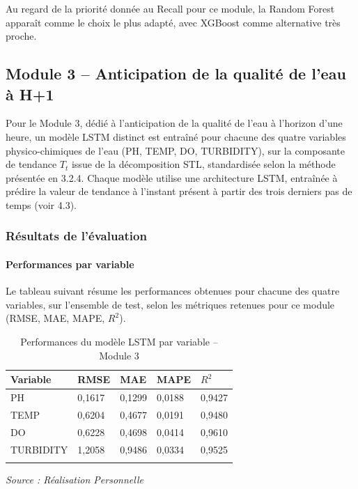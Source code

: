 \documentclass[a4paper,12pt, oneside]{article}
\begin{document}
Au regard de la priorité donnée au Recall pour ce module, la Random Forest apparaît comme le choix le plus adapté, avec XGBoost comme alternative très proche.

\subsection[Anticipation de la qualité de l'eau à H+1]{Module 3 -- Anticipation de la qualité de l'eau à H+1\\}

Pour le Module 3, dédié à l'anticipation de la qualité de l'eau à l'horizon d'une heure, un modèle LSTM distinct est entraîné pour chacune des quatre variables physico-chimiques de l'eau (PH, TEMP, DO, TURBIDITY), sur la composante de tendance $T_t$ issue de la décomposition STL, standardisée selon la méthode présentée en 3.2.4. Chaque modèle utilise une architecture LSTM, entraînée à prédire la valeur de tendance à l'instant présent à partir des trois derniers pas de temps (voir 4.3).

\subsubsection{Résultats de l'évaluation}

\paragraph{Performances par variable\\}
Le tableau suivant résume les performances obtenues pour chacune des quatre variables, sur l'ensemble de test, selon les métriques retenues pour ce module (RMSE, MAE, MAPE, $R^2$).

\begin{longtable}{|p{2.3cm}|p{1.7cm}|p{1.7cm}|p{1.7cm}|p{1.7cm}|}

\hline
\textbf{Variable} & \textbf{RMSE} & \textbf{MAE} & \textbf{MAPE} & \textbf{$R^2$} \\
\hline

PH & 0,1617 & 0,1299 & 0,0188 & 0,9427 \\
\hline
TEMP & 0,6204 & 0,4677 & 0,0191 & 0,9480 \\
\hline
DO & 0,6228 & 0,4698 & 0,0414 & 0,9610 \\
\hline
TURBIDITY & 1,2058 & 0,9486 & 0,0334 & 0,9525 \\
\hline
\caption{Performances du modèle LSTM par variable -- Module 3} 
\end{longtable}
\begin{center}
\vspace{-0.85cm}
\textit{Source : Réalisation Personnelle}
\end{center}
\end{document}
